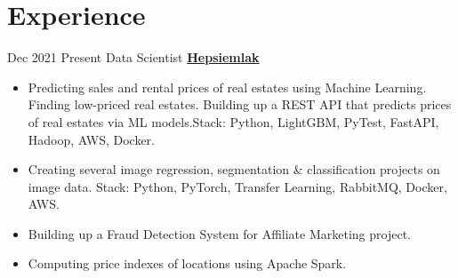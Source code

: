 \documentclass[letterpaper]{DS_class_file} %
\begin{document}
	
	\makeprofile %
	
	
	
	
	\section{Experience}
	
	\begin{twenty}
		\twentyitem
			{Dec 2021}
			{Present}
			{\hspace{0.3cm}Data Scientist}
			{\href{https://www.hepsiemlak.com/}{\textbf{Hepsiemlak}}}
			{}
			{\begin{itemize}
					\item Predicting sales and rental prices of real estates using Machine Learning. Finding low-priced real estates. Building up a REST API that predicts prices of real estates via ML models.\newline Stack: Python, LightGBM, PyTest, FastAPI, Hadoop, AWS, Docker.
				\item Creating several image regression, segmentation \& classification projects on image data. \newline Stack: Python, PyTorch, Transfer Learning, RabbitMQ, Docker, AWS.
					\item Building up a Fraud Detection System for Affiliate Marketing project.
					\item Computing price indexes of locations using Apache Spark.
				

\end{itemize}}
\end{twenty}
\end{document}
